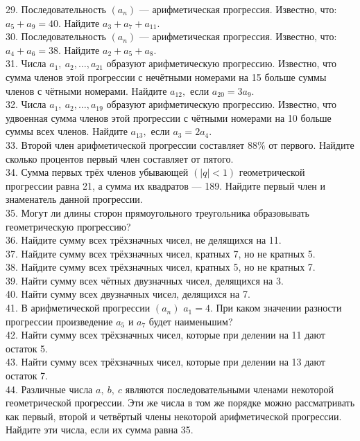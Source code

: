 \documentclass[12pt]{article}
\begin{document}
29. Последовательность $(a_n)$ --- арифметическая прогрессия. Известно, что: $a_5+a_9=40.$ Найдите $a_3+a_7+a_{11}.$\\
30. Последовательность $(a_n)$ --- арифметическая прогрессия. Известно, что: $a_4+a_6=38.$ Найдите $a_2+a_5+a_{8}.$\\
31. Числа $a_1,\ a_2,\ldots,a_{21}$ образуют арифметическую прогрессию. Известно, что сумма членов этой прогрессии с нечётными номерами на 15 больше суммы членов с чётными номерами. Найдите $a_{12},$ если $a_{20}=3a_9.$\\
32. Числа $a_1,\ a_2,\ldots,a_{19}$ образуют арифметическую прогрессию. Известно, что удвоенная сумма членов этой прогрессии с чётными номерами на 10 больше суммы всех членов. Найдите $a_{13},$ если $a_{3}=2a_4.$\\
33. Второй член арифметической прогрессии составляет $88\%$ от первого. Найдите сколько процентов первый член составляет от пятого.\\
34. Сумма первых трёх членов убывающей $(|q|<1)$ геометрической прогрессии равна 21, а сумма их квадратов --- 189. Найдите первый член и знаменатель данной прогрессии.\\
35. Могут ли длины сторон прямоугольного треугольника образовывать геометрическую прогрессию?\\
36. Найдите сумму всех трёхзначных чисел, не делящихся на 11.\\
37. Найдите сумму всех трёхзначных чисел, кратных 7, но не кратных 5.\\
38. Найдите сумму всех трёхзначных чисел, кратных 5, но не кратных 7.\\
39. Найти сумму всех чётных двузначных чисел, делящихся на 3.\\
40. Найти сумму всех двузначных чисел, делящихся на 7.\\
41. В арифметической прогрессии $(a_n)$ $a_1=4.$ При каком значении разности прогрессии произведение $a_5$ и $a_7$ будет наименьшим?\\
42. Найти сумму всех трёхзначных чисел, которые при делении на 11 дают остаток 5.\\
43. Найти сумму всех трёхзначных чисел, которые при делении на 13 дают остаток 7.\\
44. Различные числа $a,\ b,\ c$ являются последовательными членами некоторой геометрической прогрессии. Эти же числа в том же порядке можно рассматривать как первый, второй и четвёртый члены некоторой арифметической прогрессии. Найдите эти числа, если их сумма равна 35.\\
\end{document}
